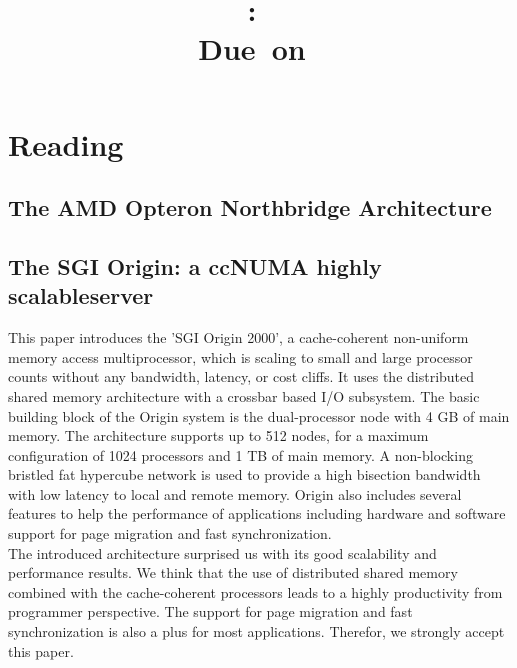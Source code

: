 \documentclass{article}
\title{
\vspace{2in}
\textmd{\textbf{\hmwkClass:\ \hmwkTitle}}\\
\normalsize\vspace{0.1in}\small{Due\ on\ \hmwkDueDate}\\
\vspace{0.1in}\large{\textit{\hmwkClassTime}}
\vspace{3in}
}
\author{\textbf{\hmwkAuthorName}}
\date{} %
\newcommand{\enterProblemHeader}[1]{
}
\newcommand{\exitProblemHeader}[1]{
}
\newcounter{homeworkProblemCounter} %
\newcommand{\homeworkProblemName}{}
\newenvironment{homeworkProblem}[1][Problem \arabic{homeworkProblemCounter}]{ %
\stepcounter{homeworkProblemCounter} %
\renewcommand{\homeworkProblemName}{#1} %
\section{\homeworkProblemName} %
}{
}
\begin{document}
\maketitle



\newpage
\newpage


\begin{homeworkProblem}[Reading]
\subsection{The AMD Opteron Northbridge Architecture}

\subsection{The SGI Origin: a ccNUMA highly scalableserver}
This paper introduces the 'SGI Origin 2000', a cache-coherent non-uniform memory access
multiprocessor, which is scaling to small and large processor counts without any bandwidth,
latency, or cost cliffs. It uses the distributed shared memory architecture with a crossbar
based I/O subsystem. The basic building block of the Origin system is the dual-processor
node with 4 GB of main memory. The architecture supports up to 512 nodes, for a maximum
configuration of 1024 processors and 1 TB of main memory. A non-blocking bristled fat
hypercube network is used to provide a high bisection bandwidth with low latency to local
and remote memory. Origin also includes several features to help the performance of 
applications including hardware and software support for page migration and fast
synchronization.
\\
The introduced architecture surprised us with its good scalability and performance results.
We think that the use of distributed shared memory combined with the cache-coherent 
processors leads to a highly productivity from programmer perspective. The support for 
page migration and fast synchronization is also a plus for most applications. Therefor, we
strongly accept this paper.
\end{homeworkProblem}
\end{document}
